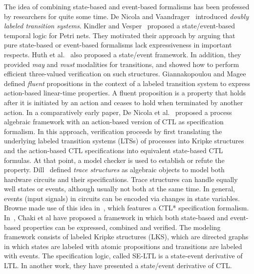 \noindent
The idea of combining state-based and event-based formalisms has been 
professed by researchers for quite some time. De Nicola and 
Vaandrager~\cite{NV95} introduced {\em doubly labeled 
transition systems}. Kindler and Vesper~\cite{KV98} proposed a
state/event-based temporal logic for Petri nets. They motivated
their approach by arguing that pure state-based or event-based
formalisms lack expressiveness in important respects. 
Huth et al.~\cite{HJS01} also proposed a state/event framework.
In addition, they provided 
{\em may} and {\em must} modalities for transitions, and showed how to 
perform efficient three-valued verification on such structures. 
Giannakopoulou and Magee~\cite{GM03} defined {\em fluent} propositions in 
the context of a labeled transition system to express action-based 
linear-time properties. A fluent proposition
is a property that holds after it is initiated by an action and ceases to
hold when terminated by another action. In a comparatively early paper,
De Nicola et al.~\cite{NFGR93} proposed a process algebraic framework with
an action-based version of CTL as specification formalism. In this
approach, verification proceeds by first translating the
underlying labeled transition systems (LTSs) of processes into Kripke 
structures and the action-based CTL specifications into equivalent state-based
CTL formulas. At that point, a model checker is used to establish
or refute the property. Dill~\cite{dill:89} defined {\em trace structures} as
algebraic objects to model both hardware circuits and their 
specifications. Trace structures can handle equally well states or events, 
although usually not both at the same time. In general, events (input 
signals) in circuits can be encoded via changes in state variables. Browne 
made use of this idea in~\cite{Bro89}, which features a CTL* specification
formalism. 
In~\cite{chaki1, chaki2}, Chaki et al have proposed a framework in which
both state-based and event-based properties can be expressed, combined and 
verified. The modeling framework consists of labeled Kripke structures (LKS),
which are directed graphs in which states are labeled with atomic propositions
and transitions are labeled with events. The specification logic, called
SE-LTL is a state-event derivative of LTL. In another work, they have
presented a state/event derivative of CTL. 

